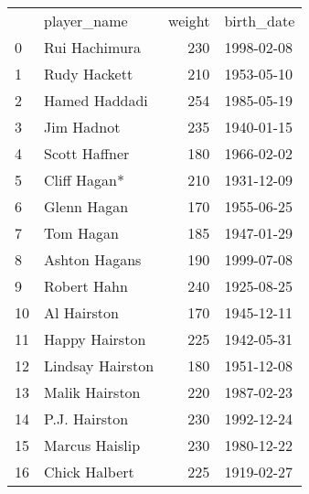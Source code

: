 \begin{tabular}{llrl}

{} &       player\_name &  weight &  birth\_date \\

0  &     Rui Hachimura &     230 &  1998-02-08 \\
1  &      Rudy Hackett &     210 &  1953-05-10 \\
2  &     Hamed Haddadi &     254 &  1985-05-19 \\
3  &        Jim Hadnot &     235 &  1940-01-15 \\
4  &     Scott Haffner &     180 &  1966-02-02 \\
5  &      Cliff Hagan* &     210 &  1931-12-09 \\
6  &       Glenn Hagan &     170 &  1955-06-25 \\
7  &         Tom Hagan &     185 &  1947-01-29 \\
8  &     Ashton Hagans &     190 &  1999-07-08 \\
9  &       Robert Hahn &     240 &  1925-08-25 \\
10 &       Al Hairston &     170 &  1945-12-11 \\
11 &    Happy Hairston &     225 &  1942-05-31 \\
12 &  Lindsay Hairston &     180 &  1951-12-08 \\
13 &    Malik Hairston &     220 &  1987-02-23 \\
14 &     P.J. Hairston &     230 &  1992-12-24 \\
15 &    Marcus Haislip &     230 &  1980-12-22 \\
16 &     Chick Halbert &     225 &  1919-02-27 \\

\end{tabular}

